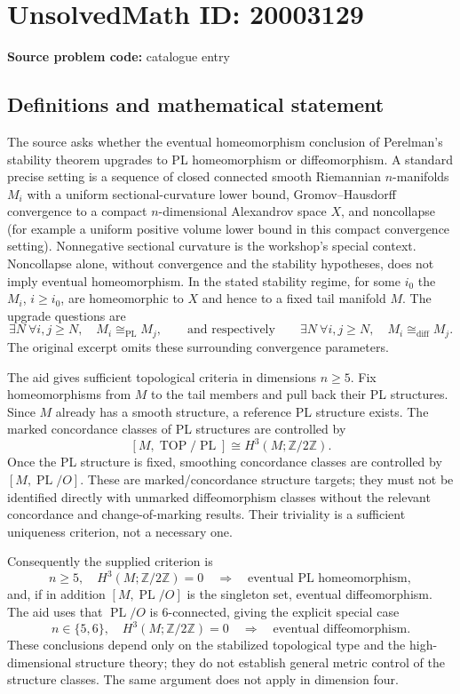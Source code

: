 \documentclass[11pt]{article}
\newcommand{\Z}{\mathbb{Z}}
\begin{document}
\section*{UnsolvedMath ID: 20003129}
\textbf{Source problem code:} catalogue entry
\subsection{Definitions and mathematical statement}
The source asks whether the eventual homeomorphism conclusion of Perelman's stability theorem upgrades to PL homeomorphism or diffeomorphism. A standard precise setting is a sequence of closed connected smooth Riemannian $n$-manifolds $M_i$ with a uniform sectional-curvature lower bound, Gromov--Hausdorff convergence to a compact $n$-dimensional Alexandrov space $X$, and noncollapse (for example a uniform positive volume lower bound in this compact convergence setting). Nonnegative sectional curvature is the workshop's special context. Noncollapse alone, without convergence and the stability hypotheses, does not imply eventual homeomorphism. In the stated stability regime, for some $i_0$ the $M_i$, $i\geq i_0$, are homeomorphic to $X$ and hence to a fixed tail manifold $M$. The upgrade questions are
\[
\exists N\ \forall i,j\geq N,\quad M_i\cong_{\mathrm{PL}}M_j,
\qquad\text{and respectively}\qquad
\exists N\ \forall i,j\geq N,\quad M_i\cong_{\mathrm{diff}}M_j.
\]
The original excerpt omits these surrounding convergence parameters.

The aid gives sufficient topological criteria in dimensions $n\geq5$. Fix homeomorphisms from $M$ to the tail members and pull back their PL structures. Since $M$ already has a smooth structure, a reference PL structure exists. The marked concordance classes of PL structures are controlled by
\[
[M,\operatorname{TOP}/\operatorname{PL}]\cong H^3(M;\Z/2\Z).
\]
Once the PL structure is fixed, smoothing concordance classes are controlled by $[M,\operatorname{PL}/O]$. These are marked/concordance structure targets; they must not be identified directly with unmarked diffeomorphism classes without the relevant concordance and change-of-marking results. Their triviality is a sufficient uniqueness criterion, not a necessary one.

Consequently the supplied criterion is
\[
n\geq5,\quad H^3(M;\Z/2\Z)=0
\quad\Longrightarrow\quad\text{eventual PL homeomorphism},
\]
and, if in addition $[M,\operatorname{PL}/O]$ is the singleton set, eventual diffeomorphism. The aid uses that $\operatorname{PL}/O$ is $6$-connected, giving the explicit special case
\[
n\in\{5,6\},\quad H^3(M;\Z/2\Z)=0
\quad\Longrightarrow\quad\text{eventual diffeomorphism}.
\]
These conclusions depend only on the stabilized topological type and the high-dimensional structure theory; they do not establish general metric control of the structure classes. The same argument does not apply in dimension four.
\end{document}
